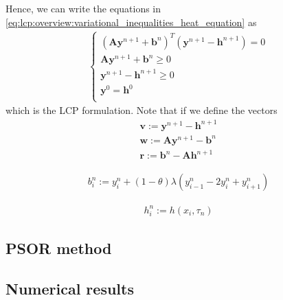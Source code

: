 Hence, we can write the equations in \eqref{eq:lcp:overview:variational_inequalities_heat_equation} as  
\begin{align}
  \begin{cases}
    (\mathbf{A}\mathbf{y}^{n+1} + \mathbf{b}^{n})^{T}(\mathbf{y}^{n+1}- \mathbf{h}^{n+1}) = 0\\
    \mathbf{A}\mathbf{y}^{n+1} + \mathbf{b}^{n} \ge 0\\
    \mathbf{y}^{n+1}- \mathbf{h}^{n+1} \ge 0 \\
    \mathbf{y}^{0} = \mathbf{h}^{0} \\  
  \end{cases}
  \label{eq:lcp:overview:variational_inequalities_heat_equation_2}
\end{align}
which is the LCP formulation. Note that if we define the vectors
\begin{align*}
  \mathbf{v} := \mathbf{y}^{n+1} - \mathbf{h}^{n+1} \\
  \mathbf{w} := \mathbf{A}\mathbf{y}^{n+1} - \mathbf{b}^{n} \\
  \mathbf{r} := \mathbf{b}^n - \mathbf{A}\mathbf{h}^{n+1}
\end{align*}

\begin{align}
    b^{n}_{i} := y^{n}_{i} + (1-\theta)\lambda(y^{n}_{i-1} - 2y^{n}_{i} + y^{n}_{i+1})
\end{align}

\begin{align}
  h^{n}_{i} := h(x_i, \tau_n)
\end{align}

\subsection{PSOR method}

\subsection{Numerical results}